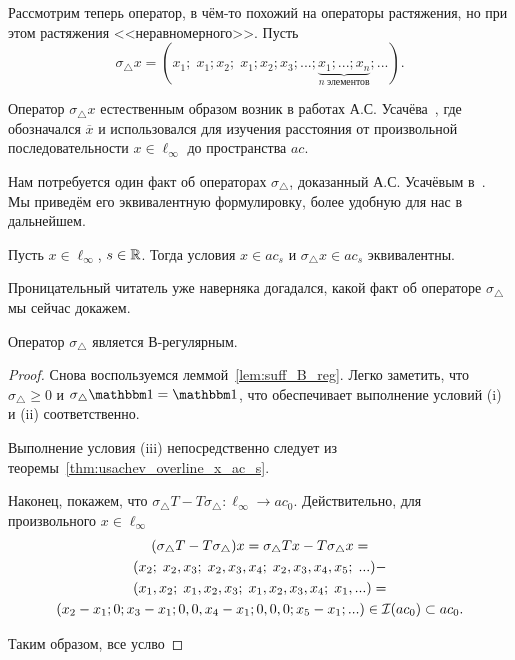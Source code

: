 Рассмотрим теперь оператор,
в чём-то похожий на операторы растяжения,
но при этом растяжения <<неравномерного>>.
Пусть
\begin{equation}
	\sigma_\triangle x =
	(x_1; \; x_1; x_2; \; x_1; x_2; x_3; ... ; \underbrace{x_1; ...; x_n}_{n~\mbox{элементов}}; ...)
	.
\end{equation}

\begin{remark}
	Оператор $\sigma_\triangle x$ естественным образом возник в работах А.С. Усачёва~\cite{usachev2009_phd_vsu},
	где обозначался $\overline{x}$ и
	использовался для изучения расстояния от произвольной последовательности $x\in\ell_\infty$
	до пространства $ac$.
\end{remark}

Нам потребуется один факт об операторах $\sigma_\triangle$,
доказанный А.С. Усачёвым в~\cite[теорема 19]{usachev2009_phd_vsu}.
Мы приведём его эквивалентную формулировку, более удобную для нас в дальнейшем.

\begin{theorem}
	\label{thm:usachev_overline_x_ac_s}
	Пусть $x\in\ell_\infty$, $s\in\mathbb{R}$.
	Тогда условия $x\in ac_s$ и $\sigma_\triangle x \in ac_s$ эквивалентны.
\end{theorem}

Проницательный читатель уже наверняка догадался,
какой факт об операторе $\sigma_\triangle$ мы сейчас докажем.

\begin{theorem}
	Оператор $\sigma_\triangle$ является В-регулярным.
\end{theorem}

\begin{proof}
	Снова воспользуемся леммой~\ref{lem:suff_B_reg}.
	Легко заметить, что $\sigma_\triangle \geq 0$ и $\sigma_\triangle \one  = \one$,
	что обеспечивает выполнение условий (i) и (ii) соответственно.

	Выполнение условия (iii) непосредственно следует из теоремы~\ref{thm:usachev_overline_x_ac_s}.

	Наконец, покажем, что $\sigma_\triangle T - T \sigma_\triangle  : \ell_\infty \to ac_0$.
	Действительно, для произвольного $x\in\ell_\infty$
	\begin{multline}
	(\sigma_\triangle T - T \sigma_\triangle)x =
	\sigma_\triangle Tx - T \sigma_\triangle x =
	\\
	(x_2; \; x_2, x_3; \; x_2, x_3,   x_4; \; x_2, x_3, x_4, x_5; \; ... )-
	\\
	(x_1, x_2; \; x_1,    x_2, x_3; \; x_1,   x_2, x_3, x_4; \; x_1, ... )=
	\\
	(x_2-x_1; 0; x_3-x_1; 0, 0, x_4-x_1; 0,0,0; x_5-x_1; ...) \in\mathcal{I}(ac_0)\subset ac_0
	.
	\end{multline}

	Таким образом, все услво
\end{proof}

